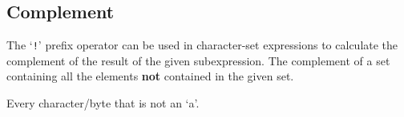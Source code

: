 
\subsection{Complement}
{
	The `\texttt{!}' prefix operator can be used in character-set expressions
	to calculate the complement of the result of the given subexpression. The
	complement of a set containing all the elements \textbf{not} contained in
	the given set.
	
	\begin{itemize}
	{
		\item[\texttt{!`a'}] Every character/byte that is not an `a'.
	}
	\end{itemize}
}
